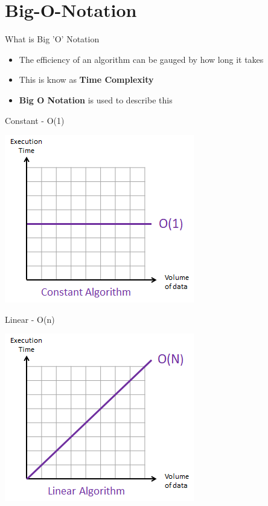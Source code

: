\part{Big-O-Notation}
\frame{\partpage}

\begin{frame}{What is Big 'O' Notation}
\begin{itemize}
	\pause \item The efficiency of an algorithm can be gauged by how long it takes
	\pause \item This is know as \textbf{Time Complexity}
	\pause \item \textbf{Big O Notation} is used to describe this
\end{itemize}
\end{frame}

\begin{frame}{Constant - O(1)}
	\begin{center}
		\includegraphics[height=0.8\textheight]{ConstantComplexity}
	\end{center}
\end{frame}

\begin{frame}{Linear - O(n)}
	\begin{center}
		\includegraphics[height=0.8\textheight]{LinearComplexity}
	\end{center}
\end{frame}

